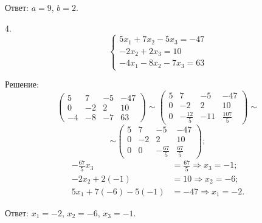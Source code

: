 \documentclass[14pt,a4paper]{extarticle}
\begin{document}
Ответ: \( a = 9 \), \( b = 2 \).

4.
\[
\begin{cases} 
5x_1 + 7x_2 - 5x_3 = -47 \\ 
-2x_2 + 2x_3 = 10 \\ 
-4x_1 - 8x_2 - 7x_3 = 63 
\end{cases}
\]

Решение:
\[
\left(\begin{array}{ccc|c}
5 & 7 & -5 & -47 \\
0 & -2 & 2 & 10 \\
-4 & -8 & -7 & 63
\end{array}\right)
\sim
\left(\begin{array}{ccc|c}
5 & 7 & -5 & -47 \\
0 & -2 & 2 & 10 \\
0 & -\frac{12}{5} & -11 & \frac{107}{5}
\end{array}\right)
\sim\]
\[
\sim
\left(\begin{array}{ccc|c}
5 & 7 & -5 & -47 \\
0 & -2 & 2 & 10 \\
0 & 0 & -\frac{67}{5} & \frac{67}{5}
\end{array}\right)
;\]
\begin{align*}
    -\frac{67}{5}x_3 &= \frac{67}{5} \Rightarrow x_3 = -1; \\
    -2x_2 + 2(-1) &= 10 \Rightarrow x_2 = -6; \\
    5x_1 + 7(-6) - 5(-1) &= -47 \Rightarrow x_1 = -2.
    \end{align*}

Ответ: \( x_1 = -2 \), \( x_2 = -6 \), \( x_3 = -1 \).
\end{document}
